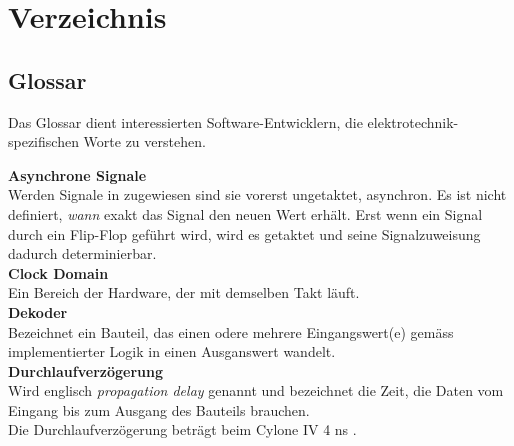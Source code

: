 
\chapter{Verzeichnis}\label{chap.verzeichnis}



\makeatletter
\renewcommand*\bib@heading{ \section{\refname}}
\makeatother



 


\section{Glossar}\label{sect.verzeichnis_glossar}
Das Glossar dient interessierten Software-Entwicklern, die elektrotechnik-spezifischen Worte zu verstehen.

\textbf{Asynchrone Signale}\\
Werden Signale in zugewiesen sind sie vorerst ungetaktet, asynchron. Es ist nicht definiert, \textit{wann} exakt das Signal den neuen Wert erhält. Erst wenn ein Signal durch ein Flip-Flop geführt wird, wird es getaktet und seine Signalzuweisung dadurch determinierbar.\\

\textbf{Clock Domain}\\
Ein Bereich der Hardware, der mit demselben Takt läuft.\\

\textbf{Dekoder}\\
Bezeichnet ein Bauteil, das einen odere mehrere Eingangswert(e) gemäss implementierter Logik in einen Ausganswert wandelt. \\

\textbf{Durchlaufverzögerung}\\
Wird englisch \textit{propagation delay} genannt und bezeichnet die Zeit, die Daten vom Eingang bis zum Ausgang des Bauteils brauchen.\\
Die Durchlaufverzögerung beträgt beim Cylone IV 4 ns \cite{Handbook_Altera}.\\

